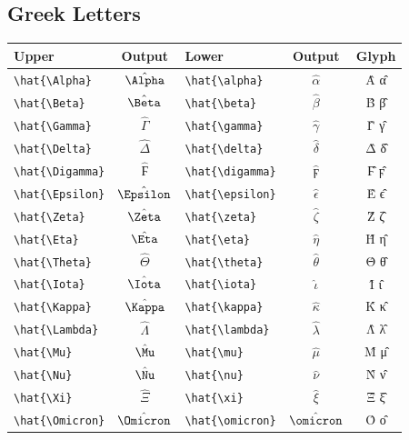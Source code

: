 \documentclass[12pt,a4paper]{article}
\begin{document}
\subsection*{Greek Letters}
\begin{longtable}{|l|c|l|c|c|}
\hline
\textbf{Upper}           & \textbf{Output}  & \textbf{Lower}           & \textbf{Output}     & \textbf{Glyph} \\
\hline
\verb|\hat{\Alpha}|      & $\hat{\Alpha}$   & \verb|\hat{\alpha}|      & $\hat{\alpha}$      & Α̂ α̂ \\
\verb|\hat{\Beta}|       & $\hat{\Beta}$    & \verb|\hat{\beta}|       & $\hat{\beta}$       & Β̂ β̂ \\
\verb|\hat{\Gamma}|      & $\hat{\Gamma}$   & \verb|\hat{\gamma}|      & $\hat{\gamma}$      & Γ̂ γ̂ \\
\verb|\hat{\Delta}|      & $\hat{\Delta}$   & \verb|\hat{\delta}|      & $\hat{\delta}$      & Δ̂ δ̂ \\
\verb|\hat{\Digamma}|    & $\hat{\Digamma}$ & \verb|\hat{\digamma}|    & $\hat{\digamma}$    & Ϝ̂ ϝ̂ \\
\verb|\hat{\Epsilon}|    & $\hat{\Epsilon}$ & \verb|\hat{\epsilon}|    & $\hat{\epsilon}$    & Ε̂ ϵ̂ \\
\verb|\hat{\Zeta}|       & $\hat{\Zeta}$    & \verb|\hat{\zeta}|       & $\hat{\zeta}$       & Ζ̂ ζ̂ \\
\verb|\hat{\Eta}|        & $\hat{\Eta}$     & \verb|\hat{\eta}|        & $\hat{\eta}$        & Η̂ η̂ \\
\verb|\hat{\Theta}|      & $\hat{\Theta}$   & \verb|\hat{\theta}|      & $\hat{\theta}$      & Θ̂ θ̂ \\
\verb|\hat{\Iota}|       & $\hat{\Iota}$    & \verb|\hat{\iota}|       & $\hat{\iota}$       & Ι̂ ι̂ \\
\verb|\hat{\Kappa}|      & $\hat{\Kappa}$   & \verb|\hat{\kappa}|      & $\hat{\kappa}$      & Κ̂ κ̂ \\
\verb|\hat{\Lambda}|     & $\hat{\Lambda}$  & \verb|\hat{\lambda}|     & $\hat{\lambda}$     & Λ̂ λ̂ \\
\verb|\hat{\Mu}|         & $\hat{\Mu}$      & \verb|\hat{\mu}|         & $\hat{\mu}$         & Μ̂ μ̂ \\
\verb|\hat{\Nu}|         & $\hat{\Nu}$      & \verb|\hat{\nu}|         & $\hat{\nu}$         & Ν̂ ν̂ \\
\verb|\hat{\Xi}|         & $\hat{\Xi}$      & \verb|\hat{\xi}|         & $\hat{\xi}$         & Ξ̂ ξ̂ \\
\verb|\hat{\Omicron}|    & $\hat{\Omicron}$ & \verb|\hat{\omicron}|    & $\hat{\omicron}$    & Ο̂ ο̂ \\

\end{longtable}
\end{document}
